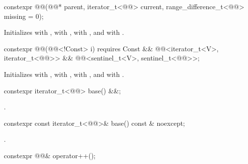 %
\begin{itemdecl}
constexpr @@(@@* parent, iterator_t<@@> current,
                   range_difference_t<@@> missing = 0);
\end{itemdecl}

\begin{itemdescr}
\pnum
\effects
Initializes  with ,
 with ,
 with , and
 with .
\end{itemdescr}

%
\begin{itemdecl}
constexpr @@(@@<!Const> i)
  requires Const && @@<iterator_t<V>, iterator_t<@@>>
                 && @@<sentinel_t<V>, sentinel_t<@@>>;
\end{itemdecl}

\begin{itemdescr}
\pnum
\effects
Initializes  with ,
 with ,
 with , and
 with .
\end{itemdescr}

%
\begin{itemdecl}
constexpr iterator_t<@@> base() &&;
\end{itemdecl}

\begin{itemdescr}
\pnum
\returns
{}.
\end{itemdescr}

%
\begin{itemdecl}
constexpr const iterator_t<@@>& base() const & noexcept;
\end{itemdecl}

\begin{itemdescr}
\pnum
\returns
{}.
\end{itemdescr}

%
\begin{itemdecl}
constexpr @@& operator++();
\end{itemdecl}

